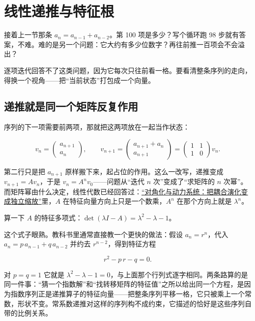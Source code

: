 \section{线性递推与特征根}
\label{sec:04-Discrete-Mathematics/02-Recurrences/02}

接着上一节那条 \(a_n=a_{n-1}+a_{n-2}\)。第 100 项是多少？写个循环跑 98 步就有答案，不难。难的是另一个问题：它大约有多少位数字？再往前推一百项会不会溢出？

逐项迭代回答不了这类问题，因为它每次只往前看一格。要看清整条序列的走向，得换一个视角——把``当前状态''打包成一个向量。

\subsection{递推就是同一个矩阵反复作用}

序列的下一项需要前两项，那就把这两项放在一起当作状态：

\[
v_n=\begin{pmatrix}a_{n+1}\\ a_n\end{pmatrix},
\qquad
v_{n+1}=\begin{pmatrix}a_{n+1}+a_n\\ a_{n+1}\end{pmatrix}
=\begin{pmatrix}1&1\\ 1&0\end{pmatrix}v_n.
\]

第二行只是把 \(a_{n+1}\) 原样搬下来，起占位的作用。这么一改写，递推变成 \(v_{n+1}=Av_n\)，于是 \(v_n=A^{n}v_0\)——问题从``迭代 \(n\) 次''变成了``求矩阵的 \(n\) 次幂''。而矩阵幂由什么决定，线性代数已经回答过：\hyperref[sec:03-Linear-Algebra/05-Eigenvalues-and-Eigenvectors/02]{``对角化与动力系统：把耦合演化变成独立缩放''}里，\(A\) 在特征向量方向上只是一个数乘，\(A^{n}\) 在那个方向上就是 \(\lambda^{n}\)。

算一下 \(A\) 的特征多项式：\(\det(\lambda I-A)=\lambda^{2}-\lambda-1\)。

这个式子眼熟。教科书里通常直接教一个更快的做法：假设 \(a_n=r^{n}\)，代入 \(a_n=p\,a_{n-1}+q\,a_{n-2}\) 并约去 \(r^{n-2}\)，得到特征方程

\[
r^{2}-p\,r-q=0.
\]

对 \(p=q=1\) 它就是 \(\lambda^2-\lambda-1=0\)，与上面那个行列式逐字相同。两条路算的是同一件事：``猜一个指数解''和``找转移矩阵的特征值''之所以给出同一个方程，是因为指数序列正是递推算子的特征向量——把整条序列平移一格，它只被乘上一个常数，形状不变。常系数递推对这样的序列构不成约束，它描述的恰好是这些序列自带的比例关系。

